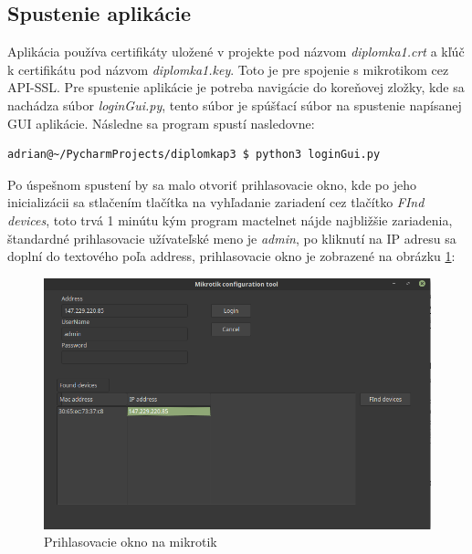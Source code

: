 \subsection{Spustenie aplikácie}
Aplikácia používa certifikáty uložené v projekte pod názvom \textit{diplomka1.crt} a kľúč k certifikátu pod názvom \textit{diplomka1.key}. Toto je pre spojenie s mikrotikom cez API-SSL. Pre spustenie aplikácie je potreba navigácie do koreňovej zložky, kde sa nachádza súbor \textit{loginGui.py}, tento súbor je spúšťací súbor na spustenie napísanej GUI aplikácie. Následne sa program spustí nasledovne:
\begin{lstlisting}[language=bash, frame=single, caption=Spustenie aplikácie,captionpos=b, showstringspaces=false, basicstyle=\footnotesize]
adrian@~/PycharmProjects/diplomkap3 $ python3 loginGui.py
\end{lstlisting}
Po úspešnom spustení by sa malo otvoriť prihlasovacie okno, kde po jeho inicializácii sa stlačením tlačítka na vyhľadanie zariadení cez tlačítko \textit{FInd devices}, toto trvá 1 minútu kým program mactelnet nájde najbližšie zariadenia, štandardné prihlasovacie užívateľské meno je \textit{admin}, po kliknutí na IP adresu sa doplní do textového poľa address, prihlasovacie okno je zobrazené na obrázku \ref{fig:winboxcustom}:
\begin{figure}[H]
\centering
\includegraphics[scale=0.48]{../text/winboxcustom.png}
\caption{Prihlasovacie okno na mikrotik}
\label{fig:winboxcustom}
\end{figure}



